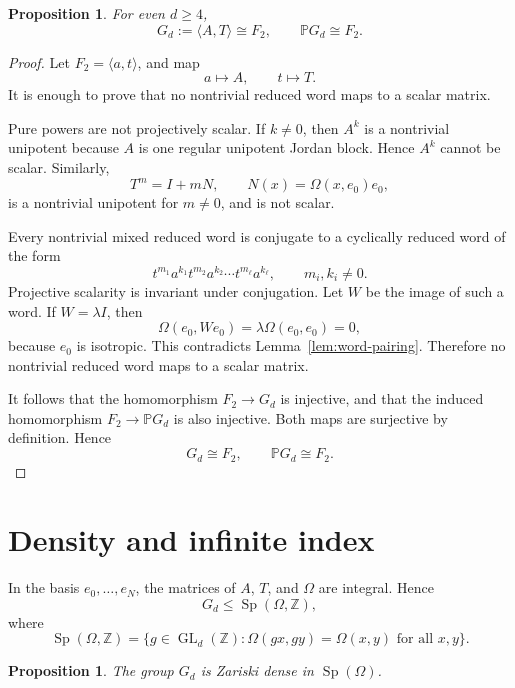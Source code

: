 \documentclass[a4paper,11pt]{amsart}
\newtheorem{proposition}[theorem]{Proposition}
\theoremstyle{remark}
\newcommand{\Z}{\mathbb Z}
\newcommand{\PP}{\mathbb P}
\DeclareMathOperator{\GL}{GL}
\DeclareMathOperator{\Sp}{Sp}
\numberwithin{equation}{section}
\begin{document}
\begin{proposition}\label{prop:free}
For even \(d\ge4\),
\[
        G_d:=\langle A,T\rangle\cong F_2,
        \qquad
        \PP G_d\cong F_2.
\]
\end{proposition}

\begin{proof}
Let \(F_2=\langle a,t\rangle\), and map
\[
        a\mapsto A,
        \qquad
        t\mapsto T.
\]
It is enough to prove that no nontrivial reduced word maps to a scalar matrix.

Pure powers are not projectively scalar.  If \(k\ne0\), then \(A^k\) is a nontrivial unipotent because \(A\) is one regular unipotent Jordan block.  Hence \(A^k\) cannot be scalar.  Similarly,
\[
        T^m=I+mN,
        \qquad
        N(x)=\Omega(x,e_0)e_0,
\]
is a nontrivial unipotent for \(m\ne0\), and is not scalar.

Every nontrivial mixed reduced word is conjugate to a cyclically reduced word of the form
\[
        t^{m_1}a^{k_1}t^{m_2}a^{k_2}\cdots t^{m_\ell}a^{k_\ell},
        \qquad
        m_i,k_i\ne0.
\]
Projective scalarity is invariant under conjugation.  Let \(W\) be the image of such a word.  If \(W=\lambda I\), then
\[
        \Omega(e_0,We_0)=\lambda\Omega(e_0,e_0)=0,
\]
because \(e_0\) is isotropic.  This contradicts Lemma~\ref{lem:word-pairing}.  Therefore no nontrivial reduced word maps to a scalar matrix.

It follows that the homomorphism \(F_2\to G_d\) is injective, and that the induced homomorphism \(F_2\to\PP G_d\) is also injective.  Both maps are surjective by definition.  Hence
\[
        G_d\cong F_2,
        \qquad
        \PP G_d\cong F_2.
\]
\end{proof}

\section{Density and infinite index}

In the basis \(e_0,\ldots,e_N\), the matrices of \(A\), \(T\), and \(\Omega\) are integral.  Hence
\[
        G_d\le \Sp(\Omega,\Z),
\]
where
\[
        \Sp(\Omega,\Z)
        =
        \{g\in\GL_d(\Z):\Omega(gx,gy)=\Omega(x,y)\text{ for all }x,y\}.
\]

\begin{proposition}\label{prop:zariski}
The group \(G_d\) is Zariski dense in \(\Sp(\Omega)\).
\end{proposition}
\end{document}
